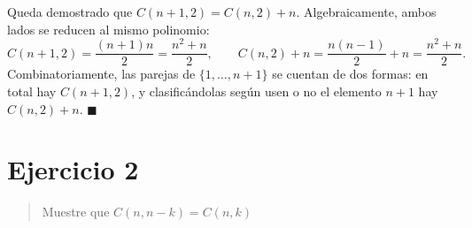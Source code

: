 \documentclass[11pt]{article}
\begin{document}
\begin{resp}
Queda demostrado que $C(n+1,2)=C(n,2)+n$. Algebraicamente, ambos lados se reducen al mismo
polinomio:
\[
C(n+1,2)=\frac{(n+1)n}{2}=\frac{n^{2}+n}{2},
\qquad
C(n,2)+n=\frac{n(n-1)}{2}+n=\frac{n^{2}+n}{2}.
\]
Combinatoriamente, las parejas de $\{1,\dots,n+1\}$ se cuentan de dos formas: en total hay
$C(n+1,2)$, y clasificándolas según usen o no el elemento $n+1$ hay $C(n,2)+n$. $\blacksquare$
\end{resp}

\section*{Ejercicio 2}

\begin{quote}
Muestre que $C(n,n-k)=C(n,k)$
\end{quote}
\end{document}
